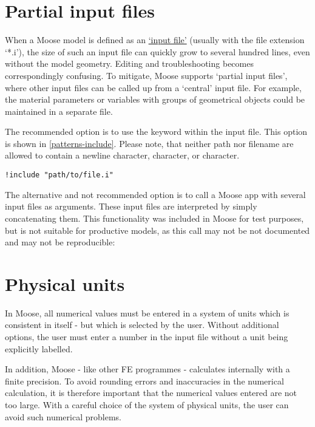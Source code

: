\section{Partial input files}
\label{chap:patterns-partial-input-files}

When a Moose model is defined as an
\href{https://mooseframework.inl.gov/application_usage/input_syntax.html}{‘input
  file’} (usually with the file extension ‘*.i’), the size of such an input file
can quickly grow to several hundred lines, even without the model geometry.
Editing and troubleshooting becomes correspondingly confusing. To mitigate,
Moose supports ‘partial input files’, where other input files can be called up
from a ‘central’ input file. For example, the material parameters or variables
with groups of geometrical objects could be maintained in a separate file.

The recommended option is to use the  keyword within the
input file. This option is shown in \autoref{patterns-include}. Please note,
that neither path nor filename are allowed to contain a newline character,
\codeword{#} character, or \codeword{[} character.

\begin{lstlisting}[language=Moose, caption={Include another input file},label={patterns-include}]
!include "path/to/file.i"
\end{lstlisting}

The alternative and not recommended option is to call a Moose app with several
input files as arguments. These input files are interpreted by simply
concatenating them. This functionality was included in Moose for test purposes,
but is not suitable for productive models, as this call may not be not
documented and may not be reproducible:


\section{Physical units}
\label{chap:patterns-physical-units}

In Moose, all numerical values must be entered in a system of units which is
consistent in itself - but which is selected by the user. Without additional
options, the user must enter a number in the input file without a unit being
explicitly labelled.

In addition, Moose - like other FE programmes - calculates internally with a
finite precision. To avoid rounding errors and inaccuracies in the numerical
calculation, it is therefore important that the numerical values entered are
not too large. With a careful choice of the system of physical units, the user
can avoid such numerical problems.


